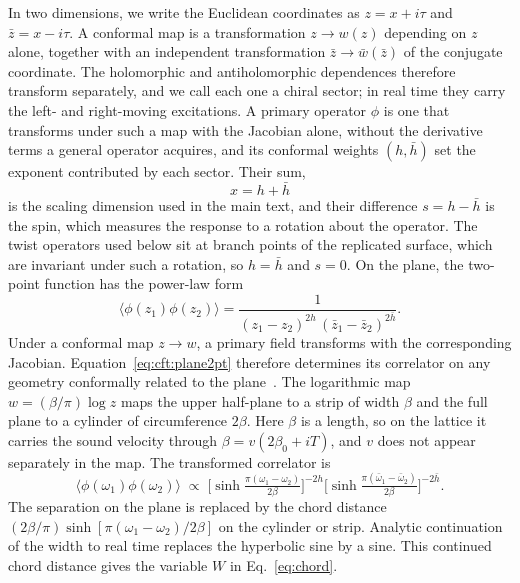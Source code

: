 In two dimensions, we write the Euclidean coordinates as $z=x+i\tau$ and $\bar z=x-i\tau$. A conformal map is a transformation $z\to w(z)$ depending on $z$ alone, together with an independent transformation $\bar z\to\bar w(\bar z)$ of the conjugate coordinate. The holomorphic and antiholomorphic dependences therefore transform separately, and we call each one a chiral sector; in real time they carry the left- and right-moving excitations. A primary operator $\phi$ is one that transforms under such a map with the Jacobian alone, without the derivative terms a general operator acquires, and its conformal weights $(h,\bar h)$ set the exponent contributed by each sector. Their sum,
\begin{equation}
  x = h + \bar h
  \label{eq:cft:dim}
\end{equation}
is the scaling dimension used in the main text, and their difference $s=h-\bar h$ is the spin, which measures the response to a rotation about the operator. The twist operators used below sit at branch points of the replicated surface, which are invariant under such a rotation, so $h=\bar h$ and $s=0$. On the plane, the two-point function has the power-law form
\begin{equation}
  \langle \phi(z_1)\phi(z_2)\rangle
  = \frac{1}{(z_1-z_2)^{2h}\,(\bar z_1-\bar z_2)^{2\bar h}}.
  \label{eq:cft:plane2pt}
\end{equation}
Under a conformal map $z\to w$, a primary field transforms with the corresponding Jacobian. Equation~\eqref{eq:cft:plane2pt} therefore determines its correlator on any geometry conformally related to the plane~\cite{difrancesco1997}. The logarithmic map $w=(\beta/\pi)\log z$ maps the upper half-plane to a strip of width $\beta$ and the full plane to a cylinder of circumference $2\beta$. Here $\beta$ is a length, so on the lattice it carries the sound velocity through $\beta=v(2\beta_0+iT)$, and $v$ does not appear separately in the map. The transformed correlator is~\cite{calabrese_cardy2004,carignano_tagliacozzo2025}
\begin{equation}
  \langle\phi(\omega_1)\phi(\omega_2)\rangle \;\propto\;
  \Big[\sinh\tfrac{\pi(\omega_1-\omega_2)}{2\beta}\Big]^{-2h}
  \Big[\sinh\tfrac{\pi(\bar\omega_1-\bar\omega_2)}{2\beta}\Big]^{-2\bar h}.
  \label{eq:cft:cyl2pt}
\end{equation}
The separation on the plane is replaced by the chord distance $(2\beta/\pi)\sinh[\pi(\omega_1-\omega_2)/2\beta]$ on the cylinder or strip. Analytic continuation of the width to real time replaces the hyperbolic sine by a sine. This continued chord distance gives the variable $W$ in Eq.~\eqref{eq:chord}.


